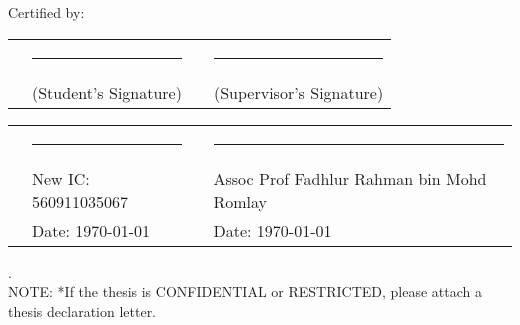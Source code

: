 \begin{onehalfspacing}
{\begin{minipage}{15cm}
\begin{flushleft}
Certified by:
\vspace{0.5cm}
\end{flushleft}

\begin{tabular}[h]{p{1cm}p{5cm}p{1cm}p{5cm}}
& \rule{5cm}{0.4pt} & & \rule{5cm}{0.4pt}\\
& (Student's Signature) & & (Supervisor's Signature)\\
\end{tabular}

\vspace{0.5cm}

\begin{tabular}[h]{p{1cm}p{5cm}p{1cm}p{5cm}}
& \rule{5cm}{0.4pt} & & \rule{5cm}{0.4pt}\\
& New IC: 560911035067 & & Assoc Prof Fadhlur Rahman bin Mohd Romlay\\
& Date: \today & & Date: \today
\end{tabular}

\end{minipage}}
{.}\\
{NOTE: *If the thesis is CONFIDENTIAL or RESTRICTED, please attach a thesis declaration letter.}
\end{onehalfspacing}